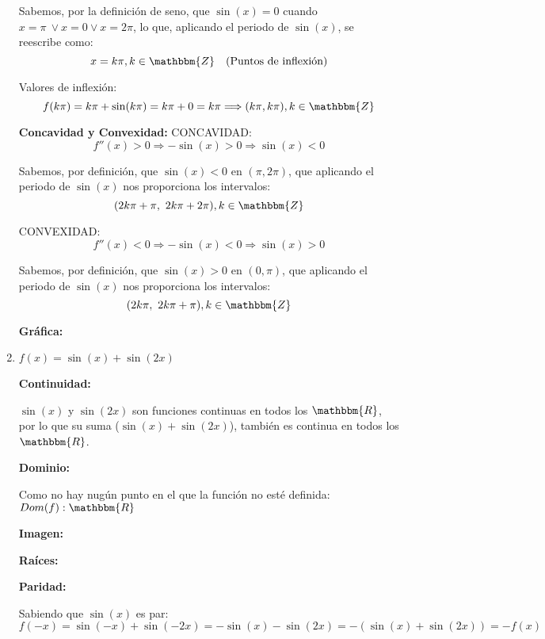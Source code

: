 \documentclass[12pt]{article}
\begin{document}
\begin{enumerate}[\hspace{9px} a)]
        Sabemos, por la definici\'on de seno, que \(\sin(x)=0\) cuando \(x=\pi \ \vee x=0 \vee x=2\pi\), lo que, aplicando el periodo de \(\sin(x)\), se reescribe como:
        \[x=k\pi, k\in\mathbbm{Z} \quad \text{(Puntos de inflexión)}\]

        Valores de inflexi\'on:
        \[f(k\pi)=k\pi+\sin(k\pi)=k\pi+0=k\pi \Longrightarrow (k\pi,k\pi), k\in\mathbbm{Z}\]

    \textbf{Concavidad y Convexidad: }\medskip
        CONCAVIDAD:
        \begin{equation*}
            f''(x)>0 \Longrightarrow -\sin(x)>0 \Longrightarrow \sin(x)<0
        \end{equation*}

        Sabemos, por definici\'on, que \(\sin(x)<0\) en \((\pi,2\pi)\), que aplicando el periodo de \(\sin(x)\) nos proporciona los intervalos:
        \[(2k\pi+\pi, \ 2k\pi+2\pi), k\in\mathbbm{Z}\]

        CONVEXIDAD:
        \begin{equation*}
            f''(x)<0 \Longrightarrow -\sin(x)<0 \Longrightarrow \sin(x)>0
        \end{equation*}

        Sabemos, por definici\'on, que \(\sin(x)>0\) en \((0,\pi)\), que aplicando el periodo de \(\sin(x)\) nos proporciona los intervalos:
        \[(2k\pi, \ 2k\pi+\pi), k\in\mathbbm{Z}\]

    \textbf{Gr\'afica: }

    \item \(f(x)=\sin(x)+\sin(2x)\)\bigskip
    
    \textbf{Continuidad: }\medskip

        \(\sin(x)\) y \(\sin(2x)\) son funciones continuas en todos los \(\mathbbm{R}\), por lo que su suma (\(\sin(x)+\sin(2x)\)), tambi\'en es continua en todos los \(\mathbbm{R}\).\medskip

    \textbf{Dominio: }\medskip

        Como no hay nug\'un punto en el que la funci\'on no est\'e definida: \(Dom(f): \mathbbm{R}\)\medskip

    \textbf{Imagen: }

    \textbf{Ra\'ices: }

    \textbf{Paridad: }\medskip
        
        Sabiendo que \(\sin(x)\) es par:
        \begin{equation*}
            f(-x)=\sin(-x)+\sin(-2x) = -\sin(x) - \sin(2x) = -(\sin(x)+\sin(2x)) = -f(x)
        \end{equation*}


\end{enumerate}
\end{document}
